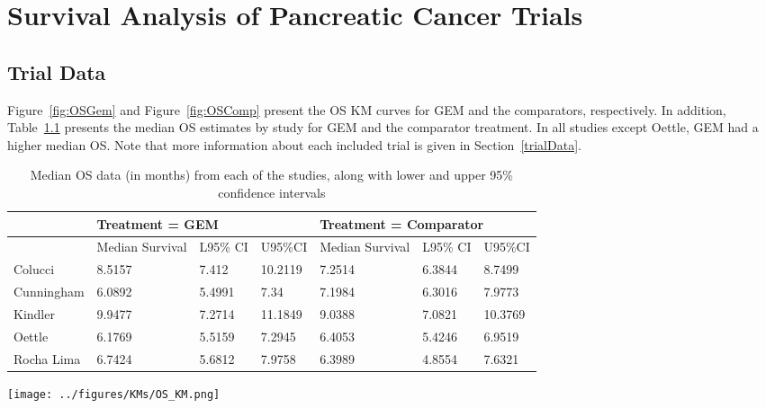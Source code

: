 \chapter{Survival Analysis of Pancreatic Cancer Trials}

\section{Trial Data}

Figure~\ref{fig:OSGem} and Figure~\ref{fig:OSComp} present the OS KM curves for GEM and the comparators, respectively. In addition, Table~\ref{tab:OS_meds} presents the median OS estimates by study for GEM and the comparator treatment. In all studies except Oettle, GEM had a higher median OS. Note that more information about each included trial is given in Section~\ref{trialData}. \\

\begin{table}[h]
    \begin{tabular}{lllllll}
    \hline
               & \multicolumn{3}{l}{Treatment = GEM}          & \multicolumn{3}{l}{Treatment = Comparator}   \\ \hline
               & Median Survival & L95\% CI & U95\%CI & Median Survival & L95\% CI & U95\%CI \\
    Colucci    & 8.5157          & 7.412        & 10.2119     & 7.2514          & 6.3844       & 8.7499      \\
    Cunningham & 6.0892          & 5.4991       & 7.34        & 7.1984          & 6.3016       & 7.9773      \\
    Kindler    & 9.9477          & 7.2714       & 11.1849     & 9.0388          & 7.0821       & 10.3769     \\
    Oettle     & 6.1769          & 5.5159       & 7.2945      & 6.4053          & 5.4246       & 6.9519      \\
    Rocha Lima & 6.7424          & 5.6812       & 7.9758      & 6.3989          & 4.8554       & 7.6321      \\ \hline
    \end{tabular}
    \caption{Median OS data (in months) from each of the studies, along with lower and upper 95\% confidence intervals}
    \label{tab:OS_meds}
\end{table}

\begin{sidewaysfigure}[ht]
    \centering
    \texttt{[image: ../figures/KMs/OS\_KM.png]}
    \caption{OS Kaplan-Meier data for Gemcitabine}
    \label{fig:OSGem}
\end{sidewaysfigure}

